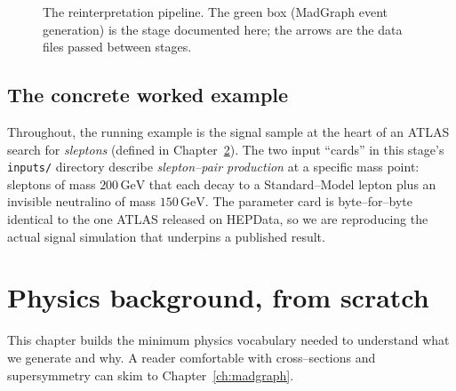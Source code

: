 \documentclass[11pt,oneside]{report}
\newcommand{\code}[1]{\texttt{#1}}
\newcommand{\GeV}{\,\text{GeV}}
\begin{document}
\begin{figure}[h]
\centering
{}
\caption{The reinterpretation pipeline. The green box (MadGraph event generation) is the stage
documented here; the arrows are the data files passed between stages.}
\label{fig:pipeline}
\end{figure}

\section{The concrete worked example}
Throughout, the running example is the signal sample at the heart of an ATLAS search for
\emph{sleptons} (defined in Chapter~\ref{ch:physics}). The two input ``cards'' in this stage's
\code{inputs/} directory describe \emph{slepton--pair production} at a specific mass point:
sleptons of mass $200\GeV$ that each decay to a Standard--Model lepton plus an invisible neutralino
of mass $150\GeV$. The parameter card is byte--for--byte identical to the one ATLAS released on
HEPData, so we are reproducing the actual signal simulation that underpins a published result.

\chapter{Physics background, from scratch}
\label{ch:physics}

This chapter builds the minimum physics vocabulary needed to understand what we generate and why.
A reader comfortable with cross--sections and supersymmetry can skim to Chapter~\ref{ch:madgraph}.
\end{document}

